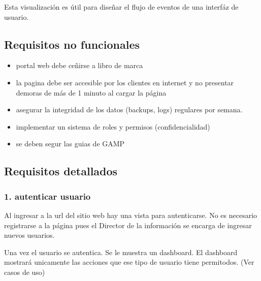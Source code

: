 \documentclass[letterpaper,10pt,spanish]{sphinxmanual}
\begin{document}
Esta visualización es útil para diseñar el flujo de eventos de una
interfáz de usuario.



\subsection{Requisitos no funcionales}
\label{\detokenize{requerimientos/srs:requisitos-no-funcionales}}\begin{itemize}
\item {} 
portal web debe ceñirse a libro de marca

\item {} 
la pagina debe ser accesible por los clientes en internet y no presentar demoras de más de 1 minuto al cargar la página

\item {} 
asegurar la integridad de los datos (backups, logs) regulares por semana.

\item {} 
implementar un sistema de roles y permisos (confidencialidad)

\item {} 
se deben segur las guias de GAMP

\end{itemize}


\subsection{Requisitos detallados}
\label{\detokenize{requerimientos/srs:requisitos-detallados}}

\subsubsection{1. autenticar usuario}
\label{\detokenize{requerimientos/srs:autenticar-usuario}}
Al ingresar a la url del sitio web hay una vista para
autenticarse. No es necesario registrarse a la página
pues el Director de la información se encarga de
ingresar nuevos usuarios.

Una vez el usuario se autentica. Se le muestra un
dashboard. El dashboard mostrará unicamente
las acciones que ese tipo de usuario tiene permitodos.
(Ver casos de uso)
\end{document}

